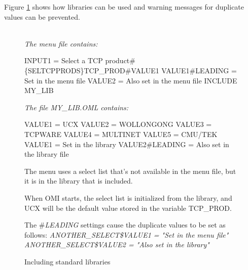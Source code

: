 \documentclass[a4paper]{book}
\newcommand{\vs}{\vspace{3mm}}
\renewcommand{\indent}{\hspace*{5mm}}
\begin{document}
\vs

Figure \ref{fig:libraries} shows how libraries can be used and warning messages for 
duplicate values can be prevented.

\begin{figure}[ht]
\begin{minipage}[t]{\textwidth}
\hrulefill \\
\textsl{The menu file contains:}

\begin{ttfamily}
 \newline
\indent INPUT1 = Select a TCP product{\#}{\{}SEL\textbar TCPPRODS{\}}TCP{\_}PROD{\#}VALUE1 \newline
{} \newline
\indent VALUE1{\#}LEADING = Set in the menu file \newline
\indent VALUE2 = Also set in the menu file \newline
\noindent{\#}INCLUDE MY{\_}LIB \newline
\end{ttfamily}

\textsl{The file MY{\_}LIB.OML contains:}

\begin{ttfamily}
\noindent[TCPPRODS] \newline
\indent VALUE1 = UCX \newline
\indent VALUE2 = WOLLONGONG \newline
\indent VALUE3 = TCPWARE \newline
\indent VALUE4 = MULTINET \newline
\indent VALUE5 = CMU/TEK
 \newline
\indent VALUE1 = Set in the library \newline
\indent VALUE2{\#}LEADING = Also set in the library file
\end{ttfamily}

\noindent The menu uses a select list that's not available in the menu file, but it is 
in the library that is included.

When OMI starts, the select list is initialized from the library, and UCX 
will be the default value stored in the variable TCP{\_}PROD.

The {\#}\textsl{LEADING} settings cause the duplicate values to be set as follows: \newline
\indent\textsl{ANOTHER{\_}SELECT{\$}VALUE1 = "Set in the menu file"} \newline
\indent\textsl{ANOTHER{\_}SELECT{\$}VALUE2 = "Also set in the library"}

\caption{Including standard libraries}\label{fig:libraries}
\hrulefill
\end{minipage}
\end{figure}
\end{document}
